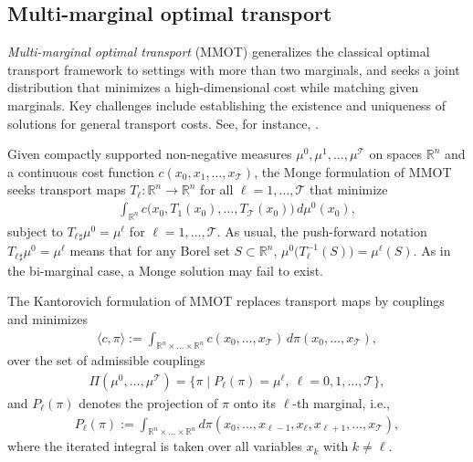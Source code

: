 \documentclass[11pt]{article}
\newcommand{\calT}{{\mathcal T}}
\newcommand{\R}{\mathbb R}
\begin{document}
\subsection{Multi-marginal optimal transport}

\emph{Multi-marginal optimal transport} (MMOT) generalizes the classical optimal transport framework to settings with more than two marginals, and seeks a joint distribution that minimizes a high-dimensional cost while matching given marginals. Key challenges include establishing the existence and uniqueness of solutions for general transport costs. See, for instance, \cite{chiappori2016multidimensional,kim2014general,pass2015multi}.

Given compactly supported non-negative measures $\mu^0, \mu^1, \dots, \mu^{\calT}$ on spaces $\mathbb R^n$ and a continuous cost function $c(x_0,x_1,\dots,x_\calT)$, the Monge formulation of MMOT seeks transport maps $T_{\ell}: \R^n \to \R^n$ for all $\ell = 1, \dots, \calT$ that minimize
\begin{align*}
\int_{\R^n} c\big(x_0,T_1(x_0),\dots,T_\calT(x_0)\big)\, d\mu^0(x_0),
\end{align*}
subject to $T_\ell{}_{\sharp}\mu^0 = \mu^\ell$ for $\ell = 1,\dots,\calT$. As usual, the push-forward notation $T_\ell{}_{\sharp}\mu^0 = \mu^\ell$ means that for any Borel set $S \subset \R^n$, $\mu^0\big(T_\ell^{-1}(S)\big) = \mu^\ell(S)$. As in the bi-marginal case, a Monge solution may fail to exist.

The Kantorovich formulation of MMOT replaces transport maps by couplings and minimizes
\begin{align}\label{eq:multi-marginal-obj}
\langle c,\pi \rangle
:= \int_{\R^n\times \dots\times \R^n}
c(x_0,\dots,x_\calT)\, d\pi (x_0,\dots,x_\calT),
\end{align}
over the set of admissible couplings
\begin{align}\label{eq:multi-marginal-set}
\Pi(\mu^0,\dots,\mu^\calT)
=\Big \{\pi \;\Big|\; P_\ell(\pi) = \mu^\ell,\ \ell = 0,1,\dots,\calT \Big\},    
\end{align}
and $P_\ell(\pi)$ denotes the projection of $\pi$ onto its $\ell$-th marginal, i.e.,
\begin{align*}
P_\ell(\pi)
:= \int_{\R^n\times \dots \times\R^n}
d\pi(x_0,\dots,x_{\ell-1},x_\ell,x_{\ell+1},\dots,x_{\calT}),
\end{align*}
where the iterated integral is taken over all variables $x_k$ with $k\neq \ell$.
\end{document}
